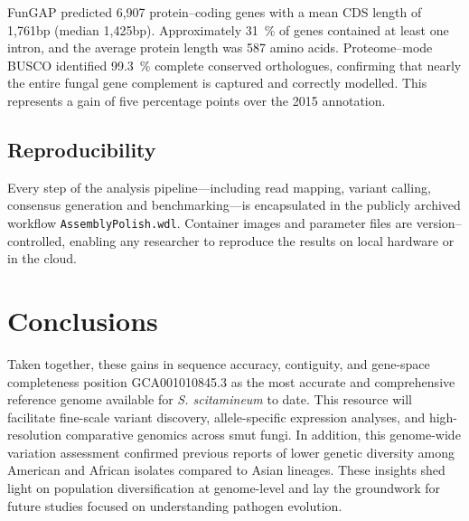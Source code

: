 \documentclass[Journal,letterpaper]{ascelike-new}
\begin{document}
FunGAP predicted 6,907 protein--coding genes with a mean CDS length
of 1,761bp (median 1,425bp). Approximately 31~\% of genes contained
at least one intron, and the average protein length was 587 amino
acids. Proteome--mode BUSCO identified 99.3~\% complete conserved
orthologues, confirming that nearly the entire fungal gene complement
is captured and correctly modelled. This represents a gain of five
percentage points over the 2015 annotation.

\subsection*{Reproducibility}

Every step of the analysis pipeline—including read mapping, variant
calling, consensus generation and benchmarking—is encapsulated in the
publicly archived workflow \texttt{AssemblyPolish.wdl}. Container
images and parameter files are version--controlled, enabling any
researcher to reproduce the results on local hardware or in the cloud.

\section*{Conclusions}

Taken together, these gains in sequence accuracy, contiguity, and
gene-space completeness position GCA001010845.3 as the most accurate
and comprehensive reference genome available for \textit{S.
scitamineum} to date. This resource will facilitate fine-scale
variant discovery, allele-specific expression analyses, and
high-resolution comparative genomics across smut fungi.
In addition, this genome-wide variation assessment confirmed
previous reports of lower genetic diversity among American and
African isolates compared to Asian lineages. These insights shed
light on population diversification at genome-level and lay the
groundwork for future studies focused on understanding pathogen evolution.
\end{document}
